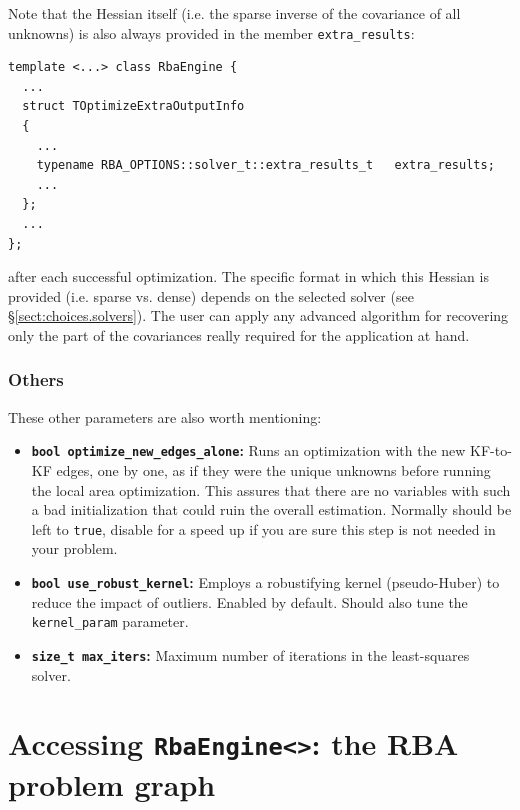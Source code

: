 \documentclass[a4paper,11pt]{article}
\begin{document}
Note that the Hessian itself (i.e. the sparse inverse of the covariance of all unknowns) 
is also always provided in the member \texttt{extra\_results}:

\begin{lstlisting}
template <...> class RbaEngine {
  ...
  struct TOptimizeExtraOutputInfo 
  {
    ...
    typename RBA_OPTIONS::solver_t::extra_results_t   extra_results; 
    ...
  };
  ...
};
\end{lstlisting}

\noindent after each successful optimization. 
The specific format in which this Hessian is provided (i.e. sparse vs. dense) depends on the selected solver 
(see \S\ref{sect:choices.solvers}). 
The user can apply any advanced algorithm for recovering only the part of the covariances really required 
for the application at hand.

\newpage
\subsubsection{Others}

These other parameters are also worth mentioning:

\begin{itemize}
\item{\textbf{\texttt{bool optimize\_new\_edges\_alone}:} Runs an optimization with the new KF-to-KF edges, 
one by one, as if they were the unique unknowns before running the local area optimization. This assures 
that there are no variables with such a bad initialization that could ruin the overall estimation. 
Normally should be left to \texttt{true}, disable for a speed up if you are sure this step is not needed 
in your problem. }

\item{\textbf{\texttt{bool use\_robust\_kernel}:} Employs a robustifying kernel (pseudo-Huber) to reduce the 
impact of outliers. Enabled by default. Should also tune the \texttt{kernel\_param} parameter.}

\item{\textbf{\texttt{size\_t max\_iters}:} Maximum number of iterations in the least-squares solver.}
\end{itemize}


\newpage
\section{Accessing \texttt{RbaEngine<>}: the RBA problem graph}
\label{sect:rba_access}
\end{document}
